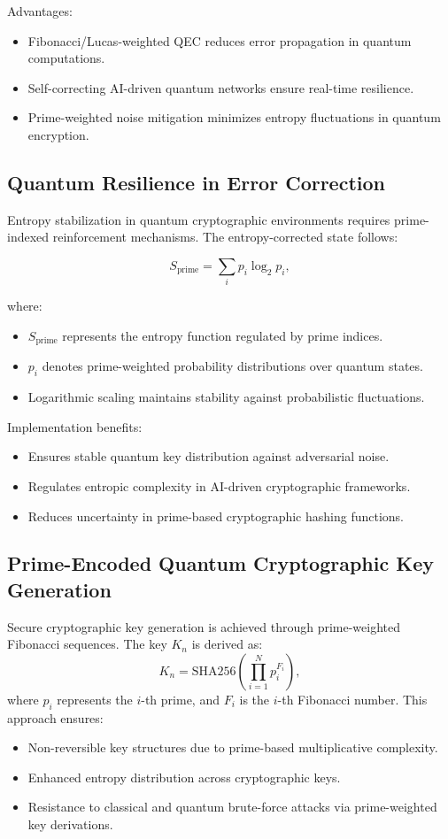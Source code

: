 \documentclass{article}
\theoremstyle{plain}
\begin{document}
Advantages:
\begin{itemize}
    \item Fibonacci/Lucas-weighted QEC reduces error propagation in quantum computations.
    \item Self-correcting AI-driven quantum networks ensure real-time resilience.
    \item Prime-weighted noise mitigation minimizes entropy fluctuations in quantum encryption.
\end{itemize}

\subsection{Quantum Resilience in Error Correction}

Entropy stabilization in quantum cryptographic environments requires prime-indexed reinforcement mechanisms. The entropy-corrected state follows:

\begin{equation}
S_{\text{prime}} = \sum_{i} p_i \log_2 p_i,
\end{equation}

where:
\begin{itemize}
    \item $S_{\text{prime}}$ represents the entropy function regulated by prime indices.
    \item $p_i$ denotes prime-weighted probability distributions over quantum states.
    \item Logarithmic scaling maintains stability against probabilistic fluctuations.
\end{itemize}

Implementation benefits:
\begin{itemize}
    \item Ensures stable quantum key distribution against adversarial noise.
    \item Regulates entropic complexity in AI-driven cryptographic frameworks.
    \item Reduces uncertainty in prime-based cryptographic hashing functions.
\end{itemize}
\subsection{Prime-Encoded Quantum Cryptographic Key Generation}

Secure cryptographic key generation is achieved through prime-weighted Fibonacci sequences. The key $K_n$ is derived as:
\begin{equation}
K_n = \text{SHA256} \left( \prod_{i=1}^{N} p_i^{F_i} \right),
\end{equation}
where $p_i$ represents the $i$-th prime, and $F_i$ is the $i$-th Fibonacci number. This approach ensures:
\begin{itemize}
    \item Non-reversible key structures due to prime-based multiplicative complexity.
    \item Enhanced entropy distribution across cryptographic keys.
    \item Resistance to classical and quantum brute-force attacks via prime-weighted key derivations.
\end{itemize}
\end{document}
